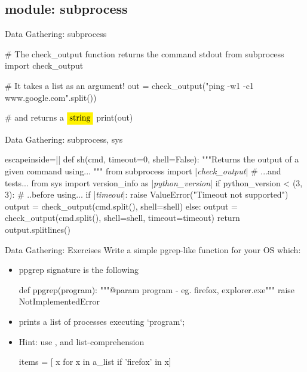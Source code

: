 \subsection{module: subprocess}
\begin{pyframe}{Data Gathering: subprocess}

%

\begin{pycode}
# The check_output function returns the command stdout
from subprocess import check_output

# It takes a list as an argument!
out = check_output("ping -w1 -c1 www.google.com".split())

# and returns a $\pyver{string}$
print(out)
\end{pycode}
\end{pyframe}

\begin{pyframe}{Data Gathering: subprocess, sys}
\begin{pycode*}{escapeinside=||}
def sh(cmd, timeout=0, shell=False):
  """Returns the output of a given command using... """
  from subprocess import |\emph{check\_output}| # ...and tests...
  from sys import version_info as |\emph{python\_version}|
  if python_version < (3, 3): # ..before using...
    if |\emph{timeout}|:
      raise ValueError("Timeout not supported")
    output = check_output(cmd.split(), shell=shell)
  else:
    output = check_output(cmd.split(), shell=shell, timeout=timeout)
  return output.splitlines()
  
    
    
\end{pycode*}
\end{pyframe}

\begin{pyframe}{Data Gathering: Exercises}
Write a simple pgrep-like function for your OS which:
\begin{itemize}
\item ppgrep signature is the following
\begin{pycode}
def ppgrep(program):
    """@param program - eg. firefox, explorer.exe"""
    raise NotImplementedError
\end{pycode}
\item prints a list of processes executing `program`;
\item Hint: use , and list-comprehension
\begin{pycode}
items = [ x for x in a_list if 'firefox' in x]
\end{pycode}
\end{itemize}
\end{pyframe}


